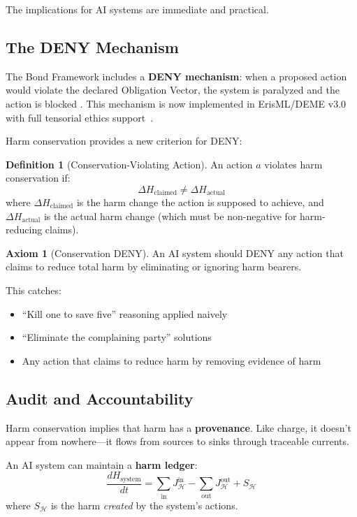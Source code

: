 \documentclass[12pt,letterpaper]{article}
\theoremstyle{definition}
\newtheorem{definition}[theorem]{Definition}
\newtheorem{axiom}{Axiom}
\theoremstyle{remark}
\newcommand{\harm}{\mathcal{H}}
\begin{document}
The implications for AI systems are immediate and practical.

\subsection{The DENY Mechanism}

The Bond Framework includes a \textbf{DENY mechanism}: when a proposed action would violate the declared Obligation Vector, the system is paralyzed and the action is blocked \cite{bond2025categorical}. This mechanism is now implemented in ErisML/DEME v3.0 with full tensorial ethics support~\cite{bond2026erisml}.

Harm conservation provides a new criterion for DENY:

\begin{definition}[Conservation-Violating Action]
An action $a$ violates harm conservation if:
\begin{equation}
\Delta H_{\text{claimed}} \neq \Delta H_{\text{actual}}
\end{equation}
where $\Delta H_{\text{claimed}}$ is the harm change the action is supposed to achieve, and $\Delta H_{\text{actual}}$ is the actual harm change (which must be non-negative for harm-reducing claims).
\end{definition}

\begin{axiom}[Conservation DENY]
An AI system should DENY any action that claims to reduce total harm by eliminating or ignoring harm bearers.
\end{axiom}

This catches:
\begin{itemize}
    \item ``Kill one to save five'' reasoning applied naively
    \item ``Eliminate the complaining party'' solutions
    \item Any action that claims to reduce harm by removing evidence of harm
\end{itemize}

\subsection{Audit and Accountability}

Harm conservation implies that harm has a \textbf{provenance}. Like charge, it doesn't appear from nowhere---it flows from sources to sinks through traceable currents.

An AI system can maintain a \textbf{harm ledger}:
\begin{equation}
\frac{d H_{\text{system}}}{dt} = \sum_{\text{in}} J_\harm^{\text{in}} - \sum_{\text{out}} J_\harm^{\text{out}} + S_\harm
\end{equation}
where $S_\harm$ is the harm \textit{created} by the system's actions.
\end{document}
